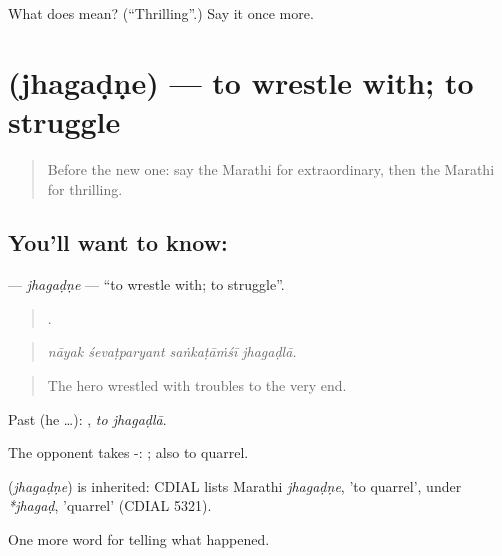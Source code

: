 \begin{tcolorbox}[breakable,colback=teal!4,colframe=teal!35!black,title={Before you move on}]
What does  mean? (\textquotedblleft{}Thrilling\textquotedblright{}.) Say it once more.
\end{tcolorbox}
\section[\texorpdfstring{\mr{झगडणे} (jhagaḍṇe)}{झगडणे (jhagaḍṇe)}]{ (jhagaḍṇe) — to wrestle with; to struggle}

\label{lesson:MR-C340-jhagadne}



\begin{quote}
Before the new one: say the Marathi for extraordinary, then the Marathi for thrilling.
\end{quote}

\subsection*{You'll want to know: }
\textbf{} — \emph{jhagaḍṇe} — \textquotedblleft{}to wrestle with; to struggle\textquotedblright{}.

\begin{quote}
   .
\end{quote}

\begin{quote}
\emph{nāyak śevaṭparyant saṅkaṭāṁśī jhagaḍlā.}
\end{quote}

\begin{quote}
The hero wrestled with troubles to the very end.
\end{quote}

Past (he …):  , \emph{to jhagaḍlā}.

The opponent takes -:  ; also to quarrel.

\begin{cousinweb}
\textbf{} (\emph{jhagaḍṇe}) is inherited: CDIAL lists Marathi \emph{jhagaḍṇe}, 'to quarrel', under \emph{*jhagaḍ}, 'quarrel' (CDIAL 5321).
\end{cousinweb}

\begin{grammarlens}[title={What you've built}]
One more word for telling what happened.
\end{grammarlens}

